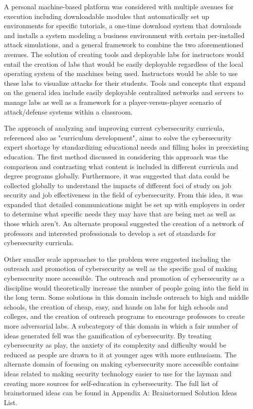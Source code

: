 \documentclass[openright]{report}
\begin{document}
\par A personal machine-based platform was considered with multiple avenues for execution including downloadable modules that automatically set up environments for specific tutorials, a one-time download system that downloads and installs a system modeling a business environment with certain per-installed attack simulations, and a general framework to combine the two aforementioned avenues. The solution of creating tools and deployable labs for instructors would entail the creation of labs that would be easily deployable regardless of the local operating system of the machines being used. Instructors would be able to use these labs to visualize attacks for their students. Tools and concepts that expand on the general idea include easily deployable centralized networks and servers to manage labs as well as a framework for a player-versus-player scenario of attack/defense systems within a classroom.

\par The approach of analyzing and improving current cybersecurity curricula, referenced also as "curriculum development", aims to solve the cybersecurity expert shortage by standardizing educational needs and filling holes in preexisting education. The first method discussed in considering this approach was the comparison and contrasting what content is included in different curricula and degree programs globally. Furthermore, it was suggested that data could be collected globally to understand the impacts of different foci of study on job security and job effectiveness in the field of cybersecurity. From this idea, it was expanded that detailed communications might be set up with employers in order to determine what specific needs they may have that are being met as well as those which aren't. An alternate proposal suggested the creation of a network of professors and interested professionals to develop a set of standards for cybersecurity curricula.

\par Other smaller scale approaches to the problem were suggested including the outreach and promotion of cybersecurity as well as the specific goal of making cybersecurity more accessible. The outreach and promotion of cybersecurity as a discipline would theoretically increase the number of people going into the field in the long term. Some solutions in this domain include outreach to high and middle schools, the creation of cheap, easy, and hands on labs for high schools and colleges, and the creation of outreach programs to encourage professors to create more adversarial labs. A subcategory of this domain in which a fair number of ideas generated fell was the gamification of cybersecurity. By treating cybersecurity as play, the anxiety of its complexity and difficulty would be reduced as people are drawn to it at younger ages with more enthusiasm. The alternate domain of focusing on making cybersecurity more accessible contains ideas related to making security technology easier to use for the layman and creating more sources for self-education in cybersecurity. The full list of brainstormed ideas can be found in Appendix A: Brainstormed Solution Ideas List.
\end{document}
